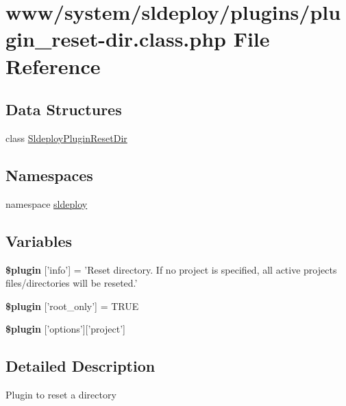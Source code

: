 \hypertarget{plugin__reset-dir_8class_8php}{
\section{www/system/sldeploy/plugins/plugin\_\-reset-\/dir.class.php File Reference}
\label{plugin__reset-dir_8class_8php}
}
\subsection*{Data Structures}
\begin{DoxyCompactItemize}
\item 
class \hyperlink{class_sldeploy_plugin_reset_dir}{SldeployPluginResetDir}
\end{DoxyCompactItemize}
\subsection*{Namespaces}
\begin{DoxyCompactItemize}
\item 
namespace \hyperlink{namespacesldeploy}{sldeploy}
\end{DoxyCompactItemize}
\subsection*{Variables}
\begin{DoxyCompactItemize}
\item 
\hypertarget{plugin__reset-dir_8class_8php_a95edf69ebbeaeedb03bab3bb010f2af9}{
{\bfseries \$plugin} \mbox{[}'info'\mbox{]} = 'Reset directory. If no project is specified, all active projects files/directories will be reseted.'}
\label{plugin__reset-dir_8class_8php_a95edf69ebbeaeedb03bab3bb010f2af9}

\item 
\hypertarget{plugin__reset-dir_8class_8php_a1d302084fa15e3efe6c843cbb5096985}{
{\bfseries \$plugin} \mbox{[}'root\_\-only'\mbox{]} = TRUE}
\label{plugin__reset-dir_8class_8php_a1d302084fa15e3efe6c843cbb5096985}

\item 
{\bfseries \$plugin} \mbox{[}'options'\mbox{]}\mbox{[}'project'\mbox{]}
\end{DoxyCompactItemize}


\subsection{Detailed Description}
Plugin to reset a directory

